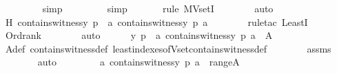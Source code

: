 \begin{isabellebody}
\ \ \ \ \ \ \ \isamarkupfalse%
\ simp\ \isanewline
\ \ \ \ \ \ \isamarkupfalse%
\ simp\isanewline
\ \ \ \ \ \ \isamarkupfalse%
{\isacharparenleft}{\kern0pt}rule\ MVsetI{\isacharparenright}{\kern0pt}\isanewline
\ \ \ \ \ \ \isamarkupfalse%
\ auto\isanewline
\ \ \ \ \isamarkupfalse%
\ \isamarkupfalse%
\ H{\isacharcolon}{\kern0pt}\ {\isachardoublequoteopen}contains{\isacharunderscore}{\kern0pt}witness{\isacharparenleft}{\kern0pt}y{\isacharcomma}{\kern0pt}\ p{\isacharcomma}{\kern0pt}\ {\isasymmu}\ a{\isachardot}{\kern0pt}\ contains{\isacharunderscore}{\kern0pt}witness{\isacharparenleft}{\kern0pt}y{\isacharcomma}{\kern0pt}\ p{\isacharcomma}{\kern0pt}\ a{\isacharparenright}{\kern0pt}{\isacharparenright}{\kern0pt}{\isachardoublequoteclose}\ \isanewline
\ \ \ \ \ \ \isamarkupfalse%
{\isacharparenleft}{\kern0pt}rule{\isacharunderscore}{\kern0pt}tac\ LeastI{\isacharparenright}{\kern0pt}\isanewline
\ \ \ \ \ \ \isamarkupfalse%
\ Ord{\isacharunderscore}{\kern0pt}rank\isanewline
\ \ \ \ \ \ \isamarkupfalse%
\ auto\isanewline
\isanewline
\ \ \ \ \isamarkupfalse%
\ {\isachardoublequoteopen}{\isacharless}{\kern0pt}{\isacharless}{\kern0pt}y{\isacharcomma}{\kern0pt}\ p{\isachargreater}{\kern0pt}{\isacharcomma}{\kern0pt}\ {\isacharparenleft}{\kern0pt}{\isasymmu}\ a{\isachardot}{\kern0pt}\ contains{\isacharunderscore}{\kern0pt}witness{\isacharparenleft}{\kern0pt}y{\isacharcomma}{\kern0pt}\ p{\isacharcomma}{\kern0pt}\ a{\isacharparenright}{\kern0pt}{\isacharparenright}{\kern0pt}{\isachargreater}{\kern0pt}\ {\isasymin}\ A{\isachardoublequoteclose}\ \isanewline
\ \ \ \ \ \ \isamarkupfalse%
\ A{\isacharunderscore}{\kern0pt}def\ contains{\isacharunderscore}{\kern0pt}witness{\isacharunderscore}{\kern0pt}def\ least{\isacharunderscore}{\kern0pt}indexes{\isacharunderscore}{\kern0pt}of{\isacharunderscore}{\kern0pt}Vset{\isacharunderscore}{\kern0pt}contains{\isacharunderscore}{\kern0pt}witness{\isacharunderscore}{\kern0pt}def\isanewline
\ \ \ \ \ \ \isamarkupfalse%
\ assms{}\ \isanewline
\ \ \ \ \ \ \isamarkupfalse%
\ auto\isanewline
\ \ \ \ \isamarkupfalse%
\ \isamarkupfalse%
\ {\isachardoublequoteopen}{\isacharparenleft}{\kern0pt}{\isasymmu}\ a{\isachardot}{\kern0pt}\ contains{\isacharunderscore}{\kern0pt}witness{\isacharparenleft}{\kern0pt}y{\isacharcomma}{\kern0pt}\ p{\isacharcomma}{\kern0pt}\ a{\isacharparenright}{\kern0pt}{\isacharparenright}{\kern0pt}\ {\isasymin}\ range{\isacharparenleft}{\kern0pt}A{\isacharparenright}{\kern0pt}{\isachardoublequoteclose}\ \isamarkupfalse%

\end{isabellebody}
